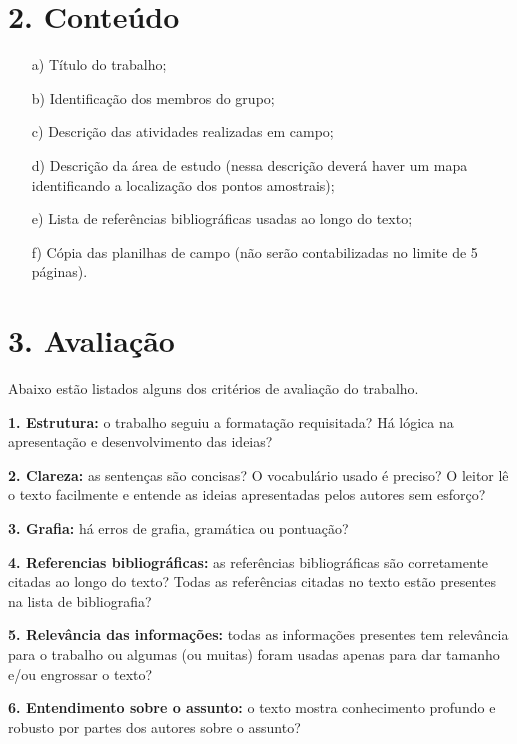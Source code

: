 \documentclass[a4paper,10pt]{article}
\begin{document}
  \section* {2. Conteúdo }
    \noindent
  \begin{itemize}
    \item[a)] Título do trabalho;
    \item[b)] Identificação dos membros do grupo;
    \item[c)] Descrição das atividades realizadas em campo;
    \item[d)] Descrição da área de estudo (nessa descrição deverá haver um mapa identificando a localização dos pontos amostrais);
    \item[e)] Lista de referências bibliográficas usadas ao longo do texto;
    \item[f)] Cópia das planilhas de campo (não serão contabilizadas no limite de 5 páginas).
  \end{itemize}
  
  \section* {3. Avaliação}

    Abaixo estão listados alguns dos critérios de avaliação do trabalho.

    \textbf{1. Estrutura:} o trabalho seguiu a formatação requisitada? Há lógica na apresentação e desenvolvimento das ideias?

    \textbf{2. Clareza:} as sentenças são concisas? O vocabulário usado é preciso? O leitor lê o texto facilmente e entende as ideias apresentadas pelos autores sem esforço?

    \textbf{3. Grafia:} há erros de grafia, gramática ou pontuação?

    \textbf{4. Referencias bibliográficas:} as referências bibliográficas são corretamente citadas ao longo do texto? Todas as referências citadas no texto estão presentes na lista de bibliografia?

    \textbf{5. Relevância das informações:} todas as informações presentes tem relevância para o trabalho ou algumas (ou muitas) foram usadas apenas para dar tamanho e/ou engrossar o texto?

    \textbf{6. Entendimento sobre o assunto:} o texto mostra conhecimento profundo e robusto por partes dos autores sobre o assunto?

  \clearpage %
\end{document}
